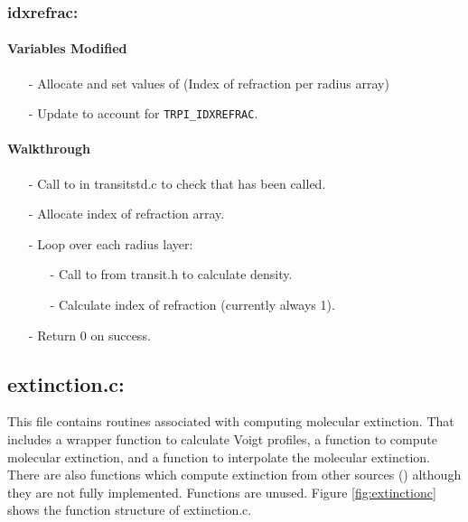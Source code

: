 \documentclass[letterpaper,12pt]{article}
\begin{document}
\subsubsection{idxrefrac:}
\paragraph{Variables Modified}
\begin{enumerate}[leftmargin=10pt, noitemsep, parsep=0pt, topsep=0ex]
\item[-] Allocate and set values of  (Index of
  refraction per radius array)
\item[-] Update  to account for {\tt TRPI\_IDXREFRAC}.
\end{enumerate}

\paragraph{Walkthrough}
\begin{enumerate}[leftmargin=10pt, noitemsep, parsep=0pt, topsep=0ex]
\item[-] Call to  in transitstd.c to check that  has been called.
\item[-] Allocate index of refraction array.
\item[-] Loop over each radius layer:
\begin{enumerate}[leftmargin=10pt, noitemsep, parsep=0pt, topsep=0ex]
\item[-] Call to  from transit.h to calculate density.
\item[-] Calculate index of refraction (currently always 1).
\end{enumerate}
\item[-] Return 0 on success.
\end{enumerate}

\newpage
\subsection{extinction.c:}
This file contains routines associated with computing molecular extinction. That includes a wrapper function to calculate Voigt profiles, a function to compute molecular extinction, and a function to interpolate the molecular extinction. There are also functions which compute extinction from other sources () although they are not fully implemented. Functions  are unused. Figure \ref{fig:extinctionc} shows the function structure of extinction.c.
\end{document}
